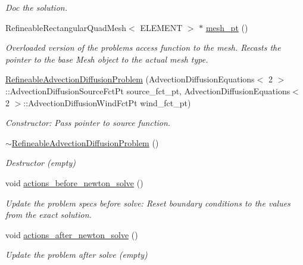 \begin{DoxyCompactItemize}
\begin{DoxyCompactList}\small\item\em Doc the solution. \end{DoxyCompactList}\item 
Refineable\+Rectangular\+Quad\+Mesh$<$ E\+L\+E\+M\+E\+NT $>$ $\ast$ \hyperlink{classRefineableAdvectionDiffusionProblem_abe616b5b3d3e4d3c0d3be777e3b3ac34}{mesh\+\_\+pt} ()
\begin{DoxyCompactList}\small\item\em Overloaded version of the problem\textquotesingle{}s access function to the mesh. Recasts the pointer to the base Mesh object to the actual mesh type. \end{DoxyCompactList}\item 
\hyperlink{classRefineableAdvectionDiffusionProblem_a515147bf0907ad339811955edb89817c}{Refineable\+Advection\+Diffusion\+Problem} (Advection\+Diffusion\+Equations$<$ 2 $>$\+::Advection\+Diffusion\+Source\+Fct\+Pt source\+\_\+fct\+\_\+pt, Advection\+Diffusion\+Equations$<$ 2 $>$\+::Advection\+Diffusion\+Wind\+Fct\+Pt wind\+\_\+fct\+\_\+pt)
\begin{DoxyCompactList}\small\item\em Constructor\+: Pass pointer to source function. \end{DoxyCompactList}\item 
\hyperlink{classRefineableAdvectionDiffusionProblem_ae746646f6c255dca13e5abe9fcf85fe3}{$\sim$\+Refineable\+Advection\+Diffusion\+Problem} ()
\begin{DoxyCompactList}\small\item\em Destructor (empty) \end{DoxyCompactList}\item 
void \hyperlink{classRefineableAdvectionDiffusionProblem_a7cbcaa45fd7e932f335cc07a83b4d3e2}{actions\+\_\+before\+\_\+newton\+\_\+solve} ()
\begin{DoxyCompactList}\small\item\em Update the problem specs before solve\+: Reset boundary conditions to the values from the exact solution. \end{DoxyCompactList}\item 
void \hyperlink{classRefineableAdvectionDiffusionProblem_a949296e60bc661fbd523974055a93f8b}{actions\+\_\+after\+\_\+newton\+\_\+solve} ()
\begin{DoxyCompactList}\small\item\em Update the problem after solve (empty) \end{DoxyCompactList}\item 

\end{DoxyCompactItemize}
